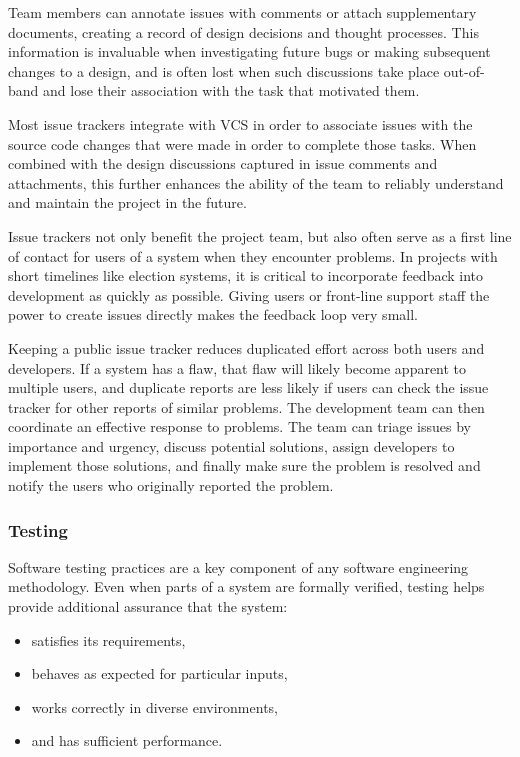 Team members can annotate issues with comments or attach supplementary
documents, creating a record of design decisions and thought
processes. This information is invaluable when investigating future
bugs or making subsequent changes to a design, and is often lost when
such discussions take place out-of-band and lose their association
with the task that motivated them.

Most issue trackers integrate with VCS in order to associate issues
with the source code changes that were made in order to complete those
tasks. When combined with the design discussions captured in issue
comments and attachments, this further enhances the ability of the
team to reliably understand and maintain the project in the future.

Issue trackers not only benefit the project team, but also often serve
as a first line of contact for users of a system when they encounter
problems. In projects with short timelines like election systems, it
is critical to incorporate feedback into development as quickly as
possible. Giving users or front-line support staff the power to create
issues directly makes the feedback loop very small.

Keeping a public issue tracker reduces duplicated effort across both
users and developers. If a system has a flaw, that flaw will likely
become apparent to multiple users, and duplicate reports are less
likely if users can check the issue tracker for other reports of
similar problems. The development team can then coordinate an
effective response to problems. The team can triage issues by
importance and urgency, discuss potential solutions, assign developers
to implement those solutions, and finally make sure the problem is
resolved and notify the users who originally reported the problem.

\subsubsection{Testing}

Software testing practices are a key component of any software
engineering methodology. Even when parts of a system are formally
verified, testing helps provide additional assurance that the system:

\begin{itemize}
\item satisfies its requirements,
\item behaves as expected for particular inputs,
\item works correctly in diverse environments,
\item and has sufficient performance.
\end{itemize}

